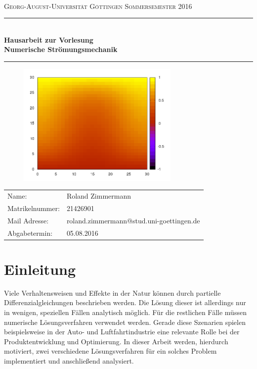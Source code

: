 \documentclass[12pt,a4paper,titlepage,headinclude,bibtotoc]{scrartcl}
\begin{document}
\begin{titlepage}
\centering
\textsc{\Large \\
[1.5ex]Georg-August-Universität Göttingen Sommersemester 2016}

\vspace*{2.2cm}

\rule{\textwidth}{1pt}\\[0.5cm]
{\large \bfseries
  Hausarbeit zur Vorlesung\\[1.5ex]
  \huge Numerische Strömungsmechanik}
\rule{\textwidth}{1pt}

\vspace*{1.0cm}

\begin{figure}[H]  
	\centering
   \includegraphics[width=0.7\textwidth]{res/title/2_05.png}
\end{figure}

\begin{Large}
\begin{tabular}{ll}
Name: & Roland Zimmermann\\
Matrikelnummer:	& 21426901 \\
Mail Adresse: & roland.zimmermann@stud.uni-goettingen.de \\ 
Abgabetermin: & 05.08.2016\\
\end{tabular}
\end{Large}

\end{titlepage}



\tableofcontents

\newpage

\section{Einleitung}
\label{sec:einleitung}
Viele Verhaltensweisen und Effekte in der Natur können durch partielle Differenzialgleichungen beschrieben werden. Die Lösung dieser ist allerdings nur in wenigen, speziellen Fällen analytisch möglich. Für die restlichen Fälle müssen numerische Lösungsverfahren verwendet werden. Gerade diese Szenarien spielen beispielsweise in der Auto- und Luftfahrtindustrie eine relevante Rolle bei der Produktentwicklung und Optimierung. In dieser Arbeit werden, hierdurch motiviert, zwei verschiedene Lösungsverfahren für ein solches Problem implementiert und anschließend analysiert.
\end{document}
